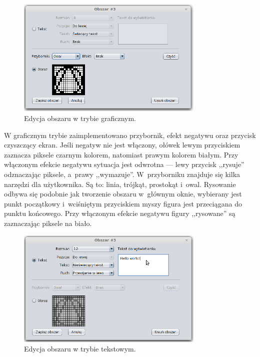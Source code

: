 \begin{figure}[htb]
	\begin{center}
		\includegraphics[width=0.8\textwidth]{figures/area.png}
	\end{center}

	\caption{Edycja obszaru w trybie graficznym.}
\end{figure}

W graficznym trybie zaimplementowano przybornik, efekt negatywu oraz przycisk czyszczący ekran. Jeśli negatyw nie jest włączony, ołówek lewym przyciskiem zaznacza piksele czarnym kolorem, natomiast prawym kolorem białym. Przy włączonym efekcie negatywu sytuacja jest odwrotna --- lewy przycisk ,,rysuje'' odznaczając piksele, a~prawy ,,wymazuje''. W~przyborniku znajduje się kilka narzędzi dla użytkownika. Są to: linia, trójkąt, prostokąt i~owal. Rysowanie odbywa się podobnie jak tworzenie obszaru w~głównym oknie, wybierany jest punkt początkowy i~wciśniętym przyciskiem myszy figura jest przeciągana do punktu końcowego. Przy włączonym efekcie negatywu figury ,,rysowane'' są zaznaczając piksele na biało.

\begin{figure}[htb]
	\begin{center}
		\includegraphics[width=0.8\textwidth]{figures/areaText.png}
	\end{center}
	\caption{Edycja obszaru w trybie tekstowym.}
\end{figure}


